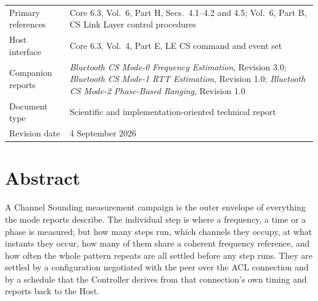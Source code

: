 \documentclass[11pt,a4paper]{article}
\begin{document}
\vfill
\noindent
\begin{tabular}{@{}L{40mm}L{95mm}@{}}
Primary references & Core 6.3, Vol.\ 6, Part H, Secs.\ 4.1--4.2 and 4.5; Vol.\ 6, Part B, CS Link
                     Layer control procedures \\
Host interface & Core 6.3, Vol.\ 4, Part E, LE CS command and event set \\
Companion reports & \emph{Bluetooth CS Mode-0 Frequency Estimation}, Revision 3.0;
                    \emph{Bluetooth CS Mode-1 RTT Estimation}, Revision 1.0;
                    \emph{Bluetooth CS Mode-2 Phase-Based Ranging}, Revision 1.0 \\
Document type & Scientific and implementation-oriented technical report \\
Revision date & 4 September 2026 \\
\end{tabular}

\newpage
{}

\section*{Abstract}

A Channel Sounding measurement campaign is the outer envelope of everything the mode reports
describe. The individual step is where a frequency, a time or a phase is measured; but how many steps
run, which channels they occupy, at what instants they occur, how many of them share a coherent
frequency reference, and how often the whole pattern repeats are all settled before any step runs.
They are settled by a configuration negotiated with the peer over the ACL connection and by a
schedule that the Controller derives from that connection's own timing and reports back to the Host.
\end{document}

